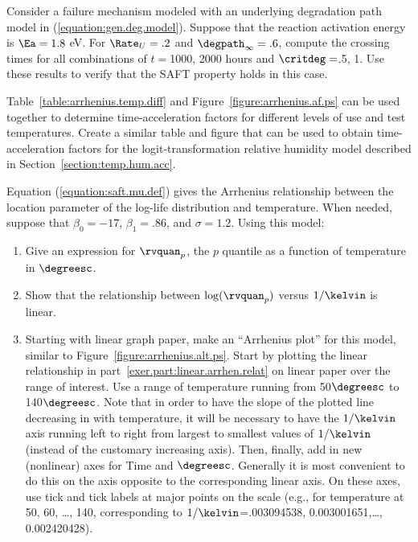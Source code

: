\begin{exercise}
Consider a failure mechanism modeled with an underlying degradation path model
in (\ref{equation:gen.deg.model}).  Suppose that the reaction
activation energy is $\Ea=1.8$ eV.  For $\Rate_{U}=.2$ and
$\degpath_{\infty}=.6$, compute the crossing times for all
combinations of $t=$1000, 2000 hours 
and $\critdeg=$.5, 1.  Use these results to
verify that the SAFT property holds in this case.
\end{exercise}



\begin{exercise}
Table~\ref{table:arrhenius.temp.diff} and
Figure~\ref{figure:arrhenius.af.ps} can be used together to
determine time-acceleration factors for different levels of use and
test temperatures.  Create a similar table and figure that can be
used to obtain time-acceleration factors for the
logit-transformation relative humidity model described in
Section~\ref{section:temp.hum.acc}.
\end{exercise}


\begin{exercise}
\label{exercise:arrhenius.scale}
Equation (\ref{equation:saft.mu.def}) gives the Arrhenius relationship
between the location parameter of the log-life distribution and
temperature. When needed, 
suppose that $\beta_{0}=-17$, $\beta_{1}=.86$, and $\sigma=1.2$.
Using this model:
\begin{enumerate}
\item
Give an expression for $\rvquan_{p}$, the $p$ quantile 
as a function of temperature in
$\degreesc$.
\item
\label{exer.part:linear.arrhen.relat}
Show that the relationship
between $\log(\rvquan_{p})$ versus $1/\kelvin$ is linear.
\item 
Starting with linear graph paper, make an ``Arrhenius plot'' for this
model, similar to Figure~\ref{figure:arrhenius.alt.ps}.  Start by
plotting the linear relationship in
part~\ref{exer.part:linear.arrhen.relat} on linear paper over the
range of interest. Use a range of temperature running from
50$\degreesc$ to 140$\degreesc$.  Note that in order to have the slope
of the plotted line decreasing in with temperature, it will be
necessary to have the $1/\kelvin$ axis running left to right from
largest to smallest values of $1/\kelvin$ (instead of the customary
increasing axis). Then, finally, add in new (nonlinear) axes for Time
and $\degreesc$.  Generally it is most convenient to do this on the
axis opposite to the corresponding linear axis. On these axes, use
tick and tick labels at major points on the scale (e.g., for
temperature at 50, 60, \dots , 140, corresponding to
$1/\kelvin$=.003094538, 0.003001651,\dots , 0.002420428).
\end{enumerate}
\end{exercise}



